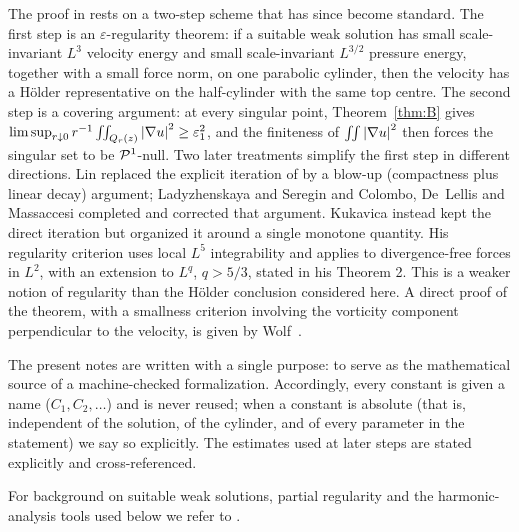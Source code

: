 \documentclass[11pt,reqno]{amsart}
\begin{document}
The proof in \cite{CKN1982} rests on a two-step scheme that has since become
standard. The first step is an $\varepsilon$-regularity theorem: if a suitable
weak solution has small scale-invariant $L^{3}$ velocity energy and small
scale-invariant $L^{3/2}$ pressure energy, together with a small force norm,
on one parabolic cylinder, then the velocity has a H\"older representative
on the half-cylinder with the same top centre. The second step
is a covering argument: at every singular point, Theorem~\ref{thm:B} gives
$\limsup_{r\downarrow0}r^{-1}\iint_{Q_{r}(z)}\left\lvert \nabla u \right\rvert^{2}\ge\varepsilon_{1}^{2}$,
and the finiteness of $\iint\left\lvert \nabla u \right\rvert^{2}$ then
forces the singular set to be $\mathcal{P}^{1}$-null. Two later treatments simplify
the first step in different directions. Lin \cite{Lin1998} replaced the explicit
iteration of \cite{CKN1982} by a blow-up (compactness plus linear decay)
argument; Ladyzhenskaya and Seregin \cite{LadyzhenskayaSeregin1999} and
Colombo, De~Lellis and Massaccesi \cite{ColomboDeLellisMassaccesi2018} completed
and corrected that argument. Kukavica \cite{Kukavica2008} instead kept the
direct iteration but organized it around a single monotone quantity. His
regularity criterion uses local $L^{5}$ integrability and applies to
divergence-free forces in $L^{2}$, with an extension to $L^{q}$, $q>5/3$,
stated in his Theorem 2. This is a weaker notion of regularity than the
H\"older conclusion considered here.
A direct proof of the theorem, with a smallness criterion involving the
vorticity component perpendicular to the velocity, is given by Wolf~\cite{Wolf2008}.

The present notes are written with a single purpose: to serve as the
mathematical source of a machine-checked formalization. Accordingly,
every constant is given a name ($C_{1},C_{2},\dots$) and is never
reused; when a constant is absolute (that is, independent of the solution, of
the cylinder, and of every parameter in the statement) we say so explicitly.
The estimates used at later steps are stated explicitly and cross-referenced.
%
%
%
%
%

For background on suitable weak solutions, partial regularity and the
harmonic-analysis tools used below we refer to
\cite{Adams1975,CKN1982,ColomboDeLellisMassaccesi2018,DiestelUhl1977,Giaquinta1983,GilbargTrudinger2001,Kukavica2008,LadyzhenskayaSeregin1999,LadyzhenskayaSolonnikovUraltseva1968,LemarieRieusset2002,LemarieRieusset2016,Lin1998,Mattila1995,OLeary2003,RobinsonRodrigoSadowski2016,Scheffer1977,Stein1970,Stein1993,Temam1977,Tsai2018,Vasseur2007}.
\end{document}
